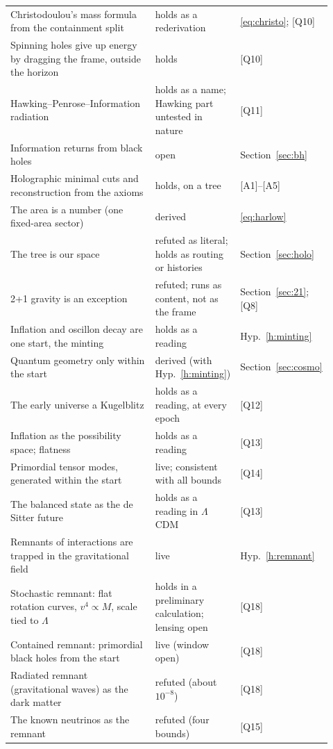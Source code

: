 \documentclass[11pt,a4paper]{article}
\theoremstyle{definition}
\theoremstyle{remark}
\newcommand{\chk}[1]{\textsf{[#1]}}
\theoremstyle{definition}
\begin{document}
\begin{center}
\begin{longtable}{@{}p{0.5\linewidth}p{0.24\linewidth}p{0.18\linewidth}@{}}
Christodoulou's mass formula from the containment split & holds as a rederivation & \eqref{eq:christo}; \chk{Q10} \\
Spinning holes give up energy by dragging the frame, outside the horizon & holds & \chk{Q10} \\
Hawking--Penrose--Information radiation & holds as a name; Hawking part untested in nature & \chk{Q11} \\
Information returns from black holes & open & Section~\ref{sec:bh} \\
Holographic minimal cuts and reconstruction from the axioms & holds, on a tree & \chk{A1}--\chk{A5} \\
The area is a number (one fixed-area sector) & derived & \eqref{eq:harlow} \\
The tree is our space & refuted as literal; holds as routing or histories & Section~\ref{sec:holo} \\
2+1 gravity is an exception & refuted; runs as content, not as the frame & Section~\ref{sec:21}; \chk{Q8} \\
Inflation and oscillon decay are one start, the minting & holds as a reading & Hyp.~\ref{h:minting} \\
Quantum geometry only within the start & derived (with Hyp.~\ref{h:minting}) & Section~\ref{sec:cosmo} \\
The early universe a Kugelblitz & holds as a reading, at every epoch & \chk{Q12} \\
Inflation as the possibility space; flatness & holds as a reading & \chk{Q13} \\
Primordial tensor modes, generated within the start & live; consistent with all bounds & \chk{Q14} \\
The balanced state as the de Sitter future & holds as a reading in $\Lambda$CDM & \chk{Q13} \\
Remnants of interactions are trapped in the gravitational field & live & Hyp.~\ref{h:remnant} \\
Stochastic remnant: flat rotation curves, $v^4\propto M$, scale tied to $\Lambda$ & holds in a preliminary calculation; lensing open & \chk{Q18} \\
Contained remnant: primordial black holes from the start & live (window open) & \chk{Q18} \\
Radiated remnant (gravitational waves) as the dark matter & refuted (about $10^{-8}$) & \chk{Q18} \\
The known neutrinos as the remnant & refuted (four bounds) & \chk{Q15} \\

\end{longtable}
\end{center}
\end{document}
